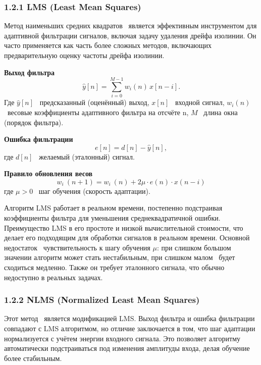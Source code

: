 \documentclass[10pt,a5paper]{article}
\numberwithin{figure}{section}
\numberwithin{table}{section}
\begin{document}
\subsubsection{1.2.1 LMS (Least Mean Squares)}
Метод наименьших средних квадратов~\cite{pandey2010} является эффективным инструментом для адаптивной фильтрации сигналов, включая задачу удаления дрейфа изолинии. Он часто применяется как часть более сложных методов, включающих предварительную оценку частоты дрейфа изолинии.

\textbf{Выход фильтра}
\begin{equation*}
  \hat{y}[n] = \sum_{i=0}^{M-1} w_i(n)\, x[n-i].
\end{equation*}
\noindent
Где \(\hat{y}[n]\) \textendash\ предсказанный (оценённый) выход, \(x[n]\) \textendash\ входной сигнал,
\(w_i(n)\) \textendash\ весовые коэффициенты адаптивного фильтра на отсчёте n, \(M\) \textendash\ длина окна (порядок фильтра).

\medskip
\textbf{Ошибка фильтрации}
\begin{equation*}
  e[n] = d[n] - \hat{y}[n],
\end{equation*}
\noindent
где \(d[n]\) \textendash\ желаемый (эталонный) сигнал.

\medskip
\textbf{Правило обновления весов}
\begin{equation*}
  w_i\ (n+1)=w_i\ (n)+2\mu\cdot e(n)\cdot x(n-i)
\end{equation*}
\noindent
где \(\mu > 0\) \textendash\ шаг обучения (скорость адаптации).


Алгоритм LMS работает в реальном времени, постепенно подстраивая коэффициенты фильтра для уменьшения среднеквадратичной ошибки. Преимущество LMS в его простоте и низкой вычислительной стоимости, что делает его подходящим для обработки сигналов в реальном времени. Основной недостаток \textendash\ чувствительность к шагу обучения $\mu$: при слишком большом значении алгоритм может стать нестабильным, при слишком малом \textendash\ будет сходиться медленно. Также он требует эталонного сигнала, что обычно недоступно в реальных задачах.

\subsubsection{1.2.2 NLMS (Normalized Least Mean Squares)}
Этот метод~\cite{rehman2012} является модификацией LMS. Выход фильтра и ошибка фильтрации совпадают с LMS алгоритмом, но отличие заключается в том, что шаг адаптации нормализуется с учётем энергии входного сигнала. Это позволяет алгоритму автоматически подстраиваться под изменения амплитуды входа, делая обучение более стабильным.
\end{document}
